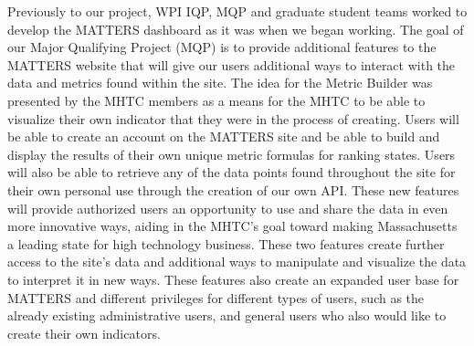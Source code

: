 	Previously to our project, WPI IQP, MQP and graduate student teams worked to 
	develop the MATTERS dashboard as it was when we began working. The goal of our 
	Major Qualifying Project (MQP) is to provide additional features to the MATTERS 
	website that will give our users additional ways to interact with the data and 
	metrics found within the site. The idea for the Metric Builder was presented by 
	the MHTC members as a means for the MHTC to be able to visualize their own 
	indicator that they were in the process of creating. Users will be able to 
	create an account on the MATTERS site and be able to build and display the 
	results of their own unique metric formulas for ranking states. Users will 
	also be able to retrieve any of the data points found throughout the site 
	for their own personal use through the creation of our own API. These new 
	features will provide authorized users an opportunity to use and share the 
	data in even more innovative ways, aiding in the MHTC's goal toward making 
	Massachusetts a leading state for high technology business. These two features 
	create further access to the site's data and additional ways to manipulate and 
	visualize the data to interpret it in new ways. These features also create an 
	expanded user base for MATTERS and different privileges for different types of 
	users, such as the already existing administrative users, and general users who 
	also would like to create their own indicators.